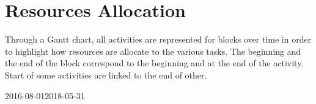 \section{Resources Allocation}
Through a Gantt chart, all activities are represented for blocks over time in order to highlight how resources are allocate to the various tasks. The beginning and the end of the block correspond to the beginning and at the end of the activity. Start of some activities are linked to the end of other.
\\
	\begin{center}
\begin{sideways}

\begin{ganttchart}[
	y unit title=0.5cm,
	y unit chart=0.5cm,
	vgrid={ dotted},
	time slot format=isodate,
	compress calendar,
	today={\the\year-\the\month-\the\day}, 
	title/.append style={shape=rectangle, fill=black!10},
	title height=1,
	bar/.append style={fill=green!90, rounded corners=3pt},
	bar height=.45,
	bar label font=\normalsize\color{black!50},
	group top shift=.6,
	group height=.3,
	group peaks height=.2,
	bar incomplete/.append style={fill=green!40},	
	]{2016-08-01}{2018-05-31}
	 \\
   \\




\end{ganttchart}
\end{sideways}
\end{center}
